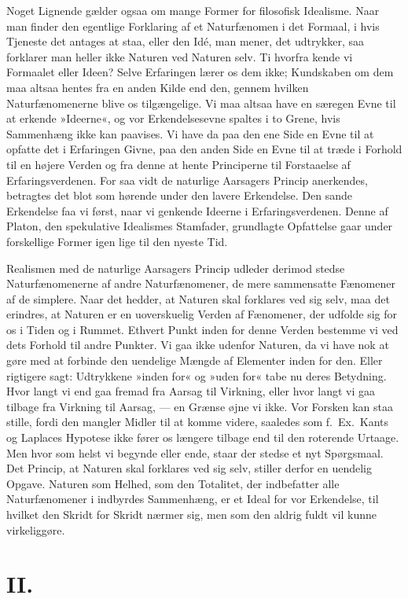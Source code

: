 \documentclass[12pt,a4paper]{article}
\begin{document}
Noget Lignende gælder ogsaa om mange Former for filosofisk Idealisme.
Naar man finder den egentlige Forklaring af et Naturfænomen i det
Formaal, i hvis Tjeneste det antages at staa, eller den Idé, man mener,
det udtrykker, saa forklarer man heller ikke Naturen ved Naturen selv.
Ti hvorfra kende vi Formaalet eller Ideen? Selve Erfaringen lærer os
dem ikke; Kundskaben om dem maa altsaa hentes fra en anden Kilde end
den, gennem hvilken Naturfænomenerne blive os tilgængelige. Vi maa
altsaa have en særegen Evne til at erkende »Ideerne«, og vor
Erkendelsesevne spaltes i to Grene, hvis Sammenhæng ikke kan paavises.
Vi have da paa den ene Side en Evne til at opfatte det i Erfaringen
Givne, paa den anden Side en Evne til at træde i Forhold til en højere
Verden og fra denne at hente Principerne til Forstaaelse af
Erfaringsverdenen. For saa vidt de naturlige Aarsagers Princip
anerkendes, betragtes det blot som hørende under den lavere Erkendelse.
Den sande Erkendelse faa vi først, naar vi genkende Ideerne i
Erfaringsverdenen. Denne af Platon, den spekulative Idealismes
Stamfader, grundlagte Opfattelse gaar under forskellige Former igen
lige til den nyeste Tid.

Realismen med de naturlige Aarsagers Princip udleder derimod stedse
Naturfænomenerne af andre Naturfænomener, de mere sammensatte Fænomener
af de simplere. Naar det hedder, at Naturen skal forklares ved sig
selv, maa det erindres, at Naturen er en uoverskuelig Verden af
Fænomener, der udfolde sig for os i Tiden og i Rummet. Ethvert Punkt
inden for denne Verden bestemme vi ved dets Forhold til andre Punkter.
Vi gaa ikke udenfor Naturen, da vi have nok at gøre med at forbinde
den uendelige Mængde af Elementer inden for den. Eller rigtigere sagt:
Udtrykkene »inden for« og »uden for« tabe nu deres Betydning. Hvor
langt vi end gaa fremad fra Aarsag til Virkning, eller hvor langt vi
gaa tilbage fra Virkning til Aarsag, --- en Grænse øjne vi ikke. Vor
Forsken kan staa stille, fordi den mangler Midler til at komme videre,
saaledes som f.\ Ex.\ Kants og Laplaces Hypotese ikke fører os længere
tilbage end til den roterende Urtaage. Men hvor som helst vi begynde
eller ende, staar der stedse et nyt Spørgsmaal. Det Princip, at Naturen
skal forklares ved sig selv, stiller derfor en uendelig Opgave. Naturen
som Helhed, som den Totalitet, der indbefatter alle Naturfænomener i
indbyrdes Sammenhæng, er et Ideal for vor Erkendelse, til hvilket den
Skridt for Skridt nærmer sig, men som den aldrig fuldt vil kunne
virkeliggøre.

\section*{II.}
\end{document}
